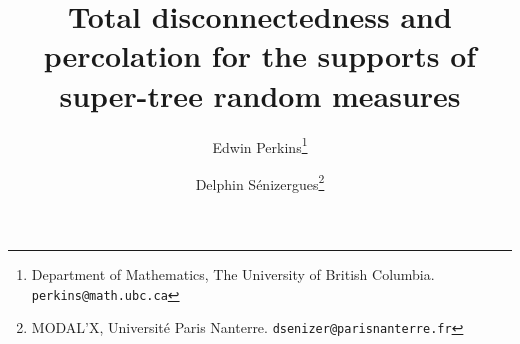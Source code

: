 \documentclass[12pt]{article}
\numberwithin{theorem}{section}
\theoremstyle{def}
\numberwithin{equation}{section}
\newcommand{\Z}{\mathbb{Z}}
\begin{document}
%	
%	
%	

\author{
	Edwin Perkins\footnote{Department of Mathematics, The University of British Columbia.  {\tt perkins@math.ubc.ca}}
	\and 
	Delphin S\'enizergues\footnote{MODAL'X, Universit\'e Paris Nanterre. {\tt dsenizer@parisnanterre.fr}}
}


\title{Total disconnectedness and percolation for the supports of super-tree random measures} 


\maketitle


\end{document}

